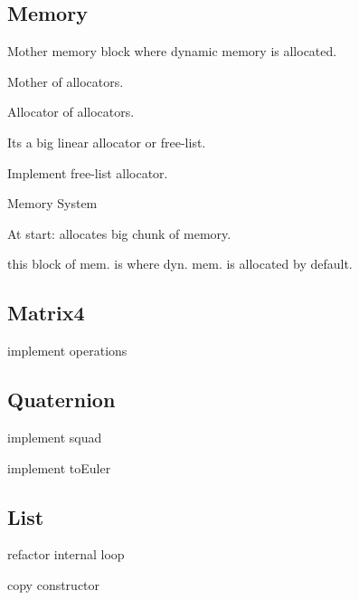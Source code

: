 



\subsection*{Memory}


\begin{DoxyItemize}
\item Mother memory block where dynamic memory is allocated.
\begin{DoxyItemize}
\item Mother of allocators.
\item Allocator of allocators.
\item It\textquotesingle{}s a big linear allocator or free-\/list.
\end{DoxyItemize}
\item Implement free-\/list allocator.
\item Memory System
\begin{DoxyItemize}
\item At start\+: allocates big chunk of memory.
\begin{DoxyItemize}
\item this block of mem. is where dyn. mem. is allocated by default. 


\end{DoxyItemize}
\end{DoxyItemize}
\end{DoxyItemize}

\subsection*{Matrix4}


\begin{DoxyItemize}
\item implement operations 


\end{DoxyItemize}

\subsection*{Quaternion}


\begin{DoxyItemize}
\item implement squad
\item implement to\+Euler 


\end{DoxyItemize}

\subsection*{List}


\begin{DoxyItemize}
\item refactor internal loop
\item copy constructor 

 
\end{DoxyItemize}
